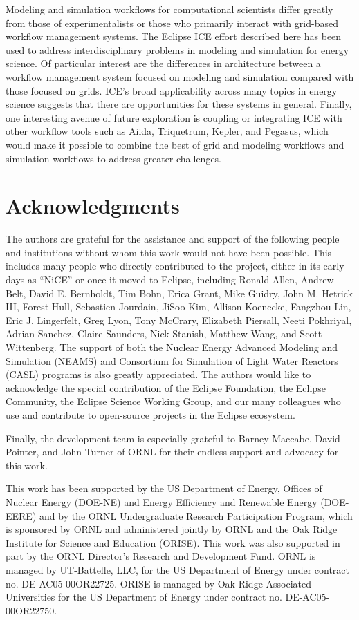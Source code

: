 Modeling and simulation workflows for computational scientists differ
greatly from those of experimentalists or those who primarily interact with
grid-based workflow management systems. The Eclipse ICE effort described here 
has been used to address interdisciplinary problems in 
modeling and simulation for energy science. Of particular interest are the
differences in architecture between a workflow management system focused
on modeling and simulation compared with those focused on grids. ICE's broad
applicability across many topics in energy science suggests that
there are opportunities for these systems in general. Finally, one 
interesting avenue of future exploration is coupling or integrating ICE 
with other workflow tools such as Aiida, Triquetrum, Kepler, and Pegasus,
which would make it possible to combine the best of grid and modeling workflows and
simulation workflows to address greater challenges.

\section*{Acknowledgments}\label{acknowledgments}

The authors are grateful for the assistance and support of the following
people and institutions without whom this work would not have been
possible. This includes many people who directly contributed to the
project, either in its early days as ``NiCE'' or once it moved to
Eclipse, including Ronald Allen, Andrew Belt, David E.
Bernholdt, Tim Bohn, Erica Grant, Mike Guidry, John M. Hetrick III, Forest Hull, 
Sebastien Jourdain, JiSoo Kim, Allison Koenecke, Fangzhou Lin, Eric J. Lingerfelt, Greg
Lyon, Tony McCrary, Elizabeth Piersall, Neeti
Pokhriyal, Adrian Sanchez, Claire Saunders, Nick Stanish, Matthew Wang, and
Scott Wittenberg. The support of both the Nuclear Energy Advanced Modeling and Simulation (NEAMS) and Consortium for Simulation of Light Water Reactors (CASL) programs is also
greatly appreciated. The authors would like to acknowledge the special
contribution of the Eclipse Foundation, the Eclipse Community, the
Eclipse Science Working Group, and our many colleagues who use and
contribute to open-source projects in the Eclipse ecosystem.

Finally, the development team is especially grateful to Barney Maccabe,
David Pointer, and John Turner of ORNL for their
endless support and advocacy for this work.

This work has been supported by the US Department of Energy, Offices of
Nuclear Energy (DOE-NE) and Energy Efficiency and Renewable Energy
(DOE-EERE) and by the ORNL Undergraduate Research Participation
Program, which is sponsored by ORNL and administered jointly by ORNL and
the Oak Ridge Institute for Science and Education (ORISE). This work was
also supported in part by the ORNL Director's
Research and Development Fund. ORNL is managed by UT-Battelle, LLC, for
the US Department of Energy under contract no. DE-AC05-00OR22725. ORISE
is managed by Oak Ridge Associated Universities for the US Department of
Energy under contract no. DE-AC05-00OR22750.

